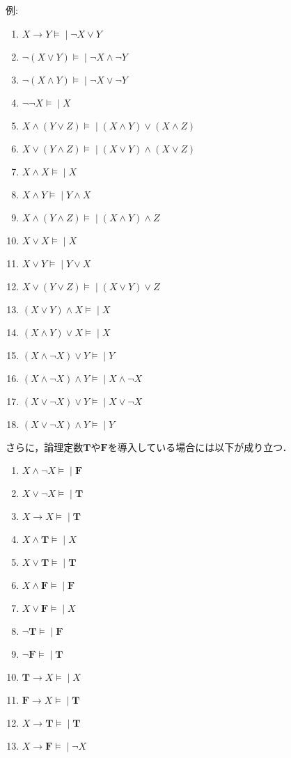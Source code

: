 \documentclass{ltjsarticle}
\theoremstyle{mystyle1}
\theoremstyle{mystyle3}
\theoremstyle{mystyle2}
\newcommand{\bT}{\ensuremath{\mathbf{T}}}
\newcommand{\bF}{\ensuremath{\mathbf{F}}}
\newcommand{\lequiv}{\ensuremath{\models\!\mid}}
\begin{document}
例:
\begin{enumerate}
  \item $X\to Y\lequiv\neg X\vee Y$
  \item $\neg\left(X\vee Y\right)\lequiv\neg X\wedge\neg Y$
  \item $\neg\left(X\wedge Y\right)\lequiv\neg X\vee\neg Y$
  \item $\neg\neg X\lequiv X$
  \item $X\wedge\left(Y\vee Z\right)\lequiv\left(X\wedge Y\right)\vee\left(X\wedge Z\right)$
  \item $X\vee\left(Y\wedge Z\right)\lequiv\left(X\vee Y\right)\wedge\left(X\vee Z\right)$
  \item $X\wedge X\lequiv X$
  \item $X\wedge Y\lequiv Y\wedge X$
  \item $X\wedge\left(Y\wedge Z\right)\lequiv\left(X\wedge Y\right)\wedge Z$
  \item $X\vee X\lequiv X$
  \item $X\vee Y\lequiv Y\vee X$
  \item $X\vee\left(Y\vee Z\right)\lequiv\left(X\vee Y\right)\vee Z$
  \item $\left(X\vee Y\right)\wedge X\lequiv X$
  \item $\left(X\wedge Y\right)\vee X\lequiv X$
  \item $\left(X\wedge\neg X\right)\vee Y\lequiv Y$
  \item $\left(X\wedge\neg X\right)\wedge Y\lequiv X\wedge\neg X$
  \item $\left(X\vee\neg X\right)\vee Y\lequiv X\vee\neg X$
  \item $\left(X\vee\neg X\right)\wedge Y\lequiv Y$
\end{enumerate}
さらに，論理定数$\bT$や$\bF$を導入している場合には以下が成り立つ．
\begin{enumerate}
  \item $X\wedge\neg X\lequiv\bF$
  \item $X\vee\neg X\lequiv\bT$
  \item $X\to X\lequiv\bT$
  \item $X\wedge\bT\lequiv X$
  \item $X\vee\bT\lequiv\bT$
  \item $X\wedge\bF\lequiv\bF$
  \item $X\vee\bF\lequiv X$
  \item $\neg\bT\lequiv\bF$
  \item $\neg\bF\lequiv\bT$
  \item $\bT\to X\lequiv X$
  \item $\bF\to X\lequiv\bT$
  \item $X\to \bT\lequiv\bT$
  \item $X\to \bF\lequiv\neg X$
\end{enumerate}
\end{document}
